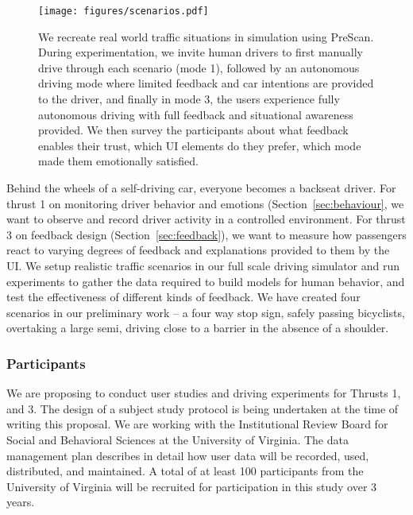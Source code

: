 \begin{figure}
    \centering
    \texttt{[image: figures/scenarios.pdf]}
    \caption{ We recreate real world traffic situations in simulation using PreScan. During experimentation, we invite human drivers to first manually drive through each scenario (mode 1), followed by an autonomous driving mode where limited feedback and car intentions are provided to the driver, and finally in mode 3, the users experience fully autonomous driving with full feedback and situational awareness provided. We then survey the participants about what feedback enables their trust, which UI elements do they prefer, which mode made them emotionally satisfied.  }
    \label{fig:scenario}
\end{figure}

Behind the wheels of a self-driving car, everyone becomes a backseat driver. For thrust 1 on monitoring driver behavior and emotions (Section~\ref{sec:behaviour}, we want to observe and record driver activity in a controlled environment. 
For thrust 3 on feedback design (Section~\ref{sec:feedback}), we want to measure how passengers react to varying degrees of feedback and explanations provided to them by the UI. 
We setup realistic traffic scenarios in our full scale driving simulator and run experiments to gather the data required to build models for human behavior, and test the effectiveness of different kinds of feedback. 
We have created four scenarios in our preliminary work – a four way stop sign, safely passing bicyclists, overtaking a large semi, driving close to a barrier in the absence of a shoulder.
\vspace{-5pt}
\subsubsection{Participants}
We are proposing to conduct user studies and driving experiments for Thrusts 1, and 3.
The design of a subject study protocol is being undertaken at the time of writing this proposal. 
We are working with the Institutional Review Board for Social and Behavioral Sciences at the University of Virginia. 
The data management plan describes in detail how user data will be recorded, used, distributed, and maintained. 
A total of at least 100 participants from the University of Virginia will be recruited for participation in this study over 3 years. 
\vspace{-5pt}

